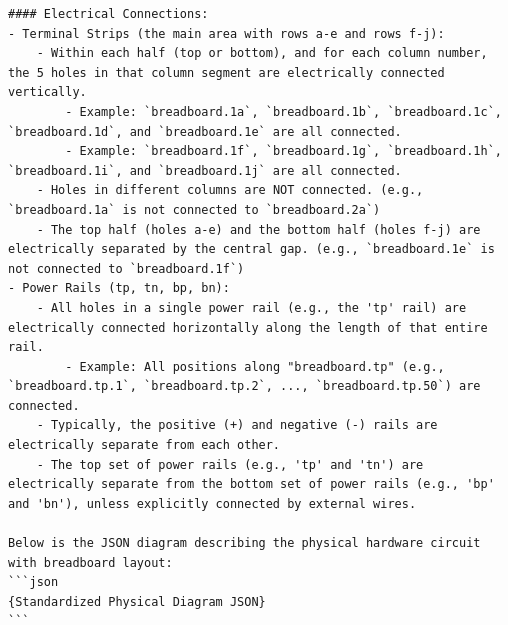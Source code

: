 \documentclass{article} %
\newlength{\promptboxmargin}
\begin{document}
\begin{adjustwidth}{\promptboxmargin}{\promptboxmargin}
\begin{lstlisting}[style=promptstyle, caption={Code Generation Task (Physical Hardware)}, basicstyle=\ttfamily\footnotesize]
#### Electrical Connections:
- Terminal Strips (the main area with rows a-e and rows f-j):
    - Within each half (top or bottom), and for each column number, the 5 holes in that column segment are electrically connected vertically.
        - Example: `breadboard.1a`, `breadboard.1b`, `breadboard.1c`, `breadboard.1d`, and `breadboard.1e` are all connected.
        - Example: `breadboard.1f`, `breadboard.1g`, `breadboard.1h`, `breadboard.1i`, and `breadboard.1j` are all connected.
    - Holes in different columns are NOT connected. (e.g., `breadboard.1a` is not connected to `breadboard.2a`)
    - The top half (holes a-e) and the bottom half (holes f-j) are electrically separated by the central gap. (e.g., `breadboard.1e` is not connected to `breadboard.1f`)
- Power Rails (tp, tn, bp, bn):
    - All holes in a single power rail (e.g., the 'tp' rail) are electrically connected horizontally along the length of that entire rail.
        - Example: All positions along "breadboard.tp" (e.g., `breadboard.tp.1`, `breadboard.tp.2`, ..., `breadboard.tp.50`) are connected.
    - Typically, the positive (+) and negative (-) rails are electrically separate from each other.
    - The top set of power rails (e.g., 'tp' and 'tn') are electrically separate from the bottom set of power rails (e.g., 'bp' and 'bn'), unless explicitly connected by external wires.

Below is the JSON diagram describing the physical hardware circuit
with breadboard layout:
```json
{Standardized Physical Diagram JSON}
```
\end{lstlisting}
\end{adjustwidth}
\end{document}
